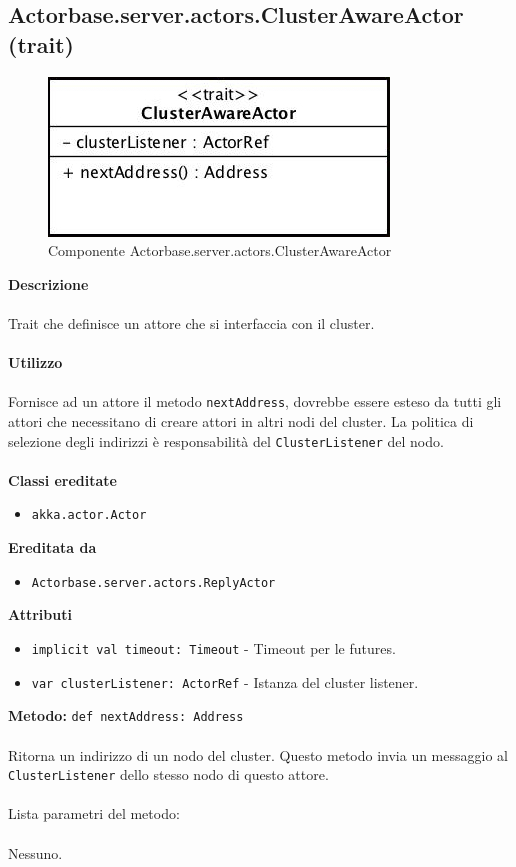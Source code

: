 \documentclass[a4paper]{article}
\begin{document}
	\subsection{Actorbase.server.actors.ClusterAwareActor (trait)}
		\begin{figure}[H]
			\centering
			\includegraphics[scale = 0.6]{Server/clusterawareactor.jpg}
			\caption{Componente Actorbase.server.actors.ClusterAwareActor}
		\end{figure}
		\textbf{Descrizione}
			\\ \\
			Trait che definisce un attore che si interfaccia con il cluster.
			\\ \\
		\textbf{Utilizzo}
			\\ \\
			Fornisce ad un attore il metodo \texttt{nextAddress}, dovrebbe essere esteso da tutti gli attori che necessitano di creare attori in altri nodi del cluster. La politica di selezione degli indirizzi è responsabilità del \texttt{ClusterListener} del nodo.
			\\ \\
		\textbf{Classi ereditate}
			\begin{itemize}
				\item \texttt{akka.actor.Actor}
			\end{itemize}
		\textbf{Ereditata da}
			\begin{itemize}
				\item \texttt{Actorbase.server.actors.ReplyActor}
			\end{itemize}
		\textbf{Attributi}
			\begin{itemize}
				\item \texttt{implicit val timeout: Timeout} - Timeout per le futures. 
				\item \texttt{var clusterListener: ActorRef} - Istanza del cluster listener. 
			\end{itemize}
		\textbf{Metodo: }\texttt{def nextAddress: Address}
			\\ \\
			Ritorna un indirizzo di un nodo del cluster. Questo metodo invia un messaggio al \texttt{ClusterListener} dello stesso nodo di questo attore.
			\\ \\
			Lista parametri del metodo:
			\\ \\
			Nessuno.
		
\end{document}
